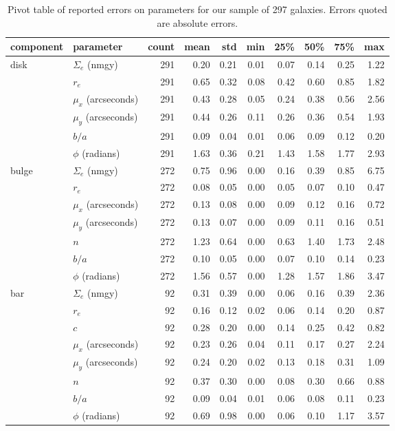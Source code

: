 \documentclass[../main.tex]{subfiles}
\begin{document}
\begin{table}
  \centering
  \caption{Pivot table of reported errors on parameters for our sample of 297 galaxies. Errors quoted are absolute errors.}
  \begin{tabular}{l|l|rrrrrrrr}
  \hline
  component & parameter &  count &  mean &   std &   min &   25\% &   50\% &   75\% &    max \\
  \hline
  disk  & $\Sigma_e$ (nmgy) &    291 &  0.20 &  0.21 &  0.01 &  0.07 &  0.14 &  0.25 &  1.22 \\
        & $r_e$ &    291 &  0.65 &  0.32 &  0.08 &  0.42 &  0.60 &  0.85 &  1.82 \\
        & $\mu_x$ (arcseconds) &    291 &  0.43 &  0.28 &  0.05 &  0.24 &  0.38 &  0.56 &  2.56 \\
        & $\mu_y$ (arcseconds) &    291 &  0.44 &  0.26 &  0.11 &  0.26 &  0.36 &  0.54 &  1.93 \\
        & $b/a$ &    291 &  0.09 &  0.04 &  0.01 &  0.06 &  0.09 &  0.12 &  0.20 \\
        & $\phi$ (radians) &    291 &  1.63 &  0.36 &  0.21 &  1.43 &  1.58 &  1.77 &  2.93 \\
  bulge & $\Sigma_e$ (nmgy) &    272 &  0.75 &  0.96 &  0.00 &  0.16 &  0.39 &  0.85 &  6.75 \\
        & $r_e$ &    272 &  0.08 &  0.05 &  0.00 &  0.05 &  0.07 &  0.10 &  0.47 \\
        & $\mu_x$ (arcseconds) &    272 &  0.13 &  0.08 &  0.00 &  0.09 &  0.12 &  0.16 &  0.72 \\
        & $\mu_y$ (arcseconds) &    272 &  0.13 &  0.07 &  0.00 &  0.09 &  0.11 &  0.16 &  0.51 \\
        & $n$ &    272 &  1.23 &  0.64 &  0.00 &  0.63 &  1.40 &  1.73 &  2.48 \\
        & $b/a$ &    272 &  0.10 &  0.05 &  0.00 &  0.07 &  0.10 &  0.14 &  0.23 \\
        & $\phi$ (radians) &    272 &  1.56 &  0.57 &  0.00 &  1.28 &  1.57 &  1.86 &  3.47 \\
  bar   & $\Sigma_e$ (nmgy) &     92 &  0.31 &  0.39 &  0.00 &  0.06 &  0.16 &  0.39 &  2.36 \\
        & $r_e$ &     92 &  0.16 &  0.12 &  0.02 &  0.06 &  0.14 &  0.20 &  0.87 \\
        & $c$ &     92 &  0.28 &  0.20 &  0.00 &  0.14 &  0.25 &  0.42 &  0.82 \\
        & $\mu_x$ (arcseconds) &     92 &  0.23 &  0.26 &  0.04 &  0.11 &  0.17 &  0.27 &  2.24 \\
        & $\mu_y$ (arcseconds) &     92 &  0.24 &  0.20 &  0.02 &  0.13 &  0.18 &  0.31 &  1.09 \\
        & $n$ &     92 &  0.37 &  0.30 &  0.00 &  0.08 &  0.30 &  0.66 &  0.88 \\
        & $b/a$ &     92 &  0.09 &  0.04 &  0.01 &  0.06 &  0.08 &  0.11 &  0.23 \\
        & $\phi$ (radians) &     92 &  0.69 &  0.98 &  0.00 &  0.06 &  0.10 &  1.17 &  3.57 \\
  \hline
  \end{tabular}
  \label{table:error_values}
\end{table}
\end{document}
